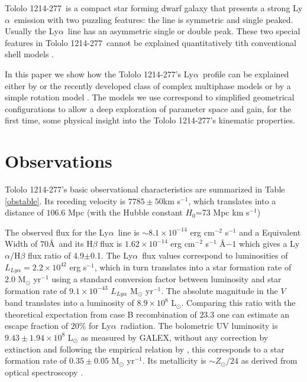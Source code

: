 \documentclass[a4,useAMS,usenatbib,usegraphicx]{mn2e}
\newcommand{\tol}{Tololo 1214-277}
\newcommand{\lya}{Ly$\alpha$}
\begin{document}
\tol\ is a compact star forming dwarf galaxy that presents a
strong \lya\ emission \citep{Thuan97} with two puzzling 
features: the line is symmetric and single peaked.
Usually the \lya\ line has an asymmetric single or double peak. 
These two special features in \tol\ cannot be explained quantitatively
tith conventional shell models
\citep{Mas-Hesse09,2015A&A...578A...7V,2015ApJ...812..123G}.   

In this paper we show how the \tol's \lya\ profile can be explained
either by  or the recently developed class of complex multiphase models 
\citep{Gronke2016} or by a simple rotation model
\citep{GaravitoCamargo2014}. 
The models we use correspond to simplified geometrical configurations
to allow a deep exploration of parameter space and gain, for the first time,
some physical insight into the \tol's kinematic properties.



\section{Observations}
\tol's basic observational characteristics are summarized in Table \ref{obstable}.
Its receding velocity is $7785\pm 50$km s$^{-1}$, which translates
into a distance of $106.6$ Mpc (with the Hubble constant $H_{0}$=73
Mpc km s$^{-1}$) 



The observed flux for the \lya\ line is $\sim
8.1\times 10^{-14}$ erg cm$^{-2}$ s$^{-1}$ \citep{Thuan97}
and a Equivalent Width of $70$\AA\ and its H$\beta$ flux is 
$1.62\times 10^{-14}$ erg cm$^{-2}$ s$^{-1}$ \AA${-1}$
\citep{Izotov04} which gives a \lya/H$\beta$ flux ratio of
4.9$\pm$0.1.
The \lya\ flux values correspond to luminosities of
$L_{Ly\alpha}=2.2\times 10^{42}$ erg s$^{-1}$, which in turn
translates  into a star formation rate of $2.0$ M$_{\odot}$ yr$^{-1}$
using a standard conversion factor between luminosity and star
formation rate of $9.1\times 10^{-43}$ $L_{Ly\alpha}$ M$_{\odot}$ yr$^{-1}$. 
The absolute magnitude in the $V$ band translates into a luminosity of
$8.9\times 10^{8}$ L$_{\odot}$.
Comparing this ratio with the theoretical expectation from case B
recombination of $23.3$ \citep{Hummer1987} one can estimate an escape
fraction of $20$\% for \lya\ radiation.
The bolometric UV luminosity is $9.43\pm1.94 \times 10^{8}$
L$_{\odot}$ as measured by GALEX, without any correction by extinction
and following the empirical relation by \cite{Kennicutt98}, this
corresponds to a star formation rate of $0.35\pm 0.05$ M$_{\odot}$
yr$^{-1}$. Its metallicity is $\sim Z_{\odot}/24$ as derived from
optical spectroscopy \citep{Izotov04}. 
\end{document}
